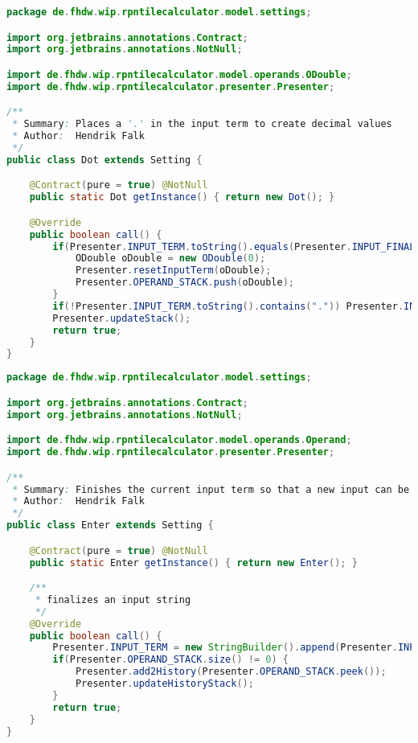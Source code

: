 \begin{lstlisting}[caption=Dot (Falk),label=list:Dot,language=Java]
package de.fhdw.wip.rpntilecalculator.model.settings;

import org.jetbrains.annotations.Contract;
import org.jetbrains.annotations.NotNull;

import de.fhdw.wip.rpntilecalculator.model.operands.ODouble;
import de.fhdw.wip.rpntilecalculator.presenter.Presenter;

/**
 * Summary: Places a '.' in the input term to create decimal values
 * Author:  Hendrik Falk
 */
public class Dot extends Setting {

    @Contract(pure = true) @NotNull
    public static Dot getInstance() { return new Dot(); }

    @Override
    public boolean call() {
        if(Presenter.INPUT_TERM.toString().equals(Presenter.INPUT_FINALIZED)) {
            ODouble oDouble = new ODouble(0);
            Presenter.resetInputTerm(oDouble);
            Presenter.OPERAND_STACK.push(oDouble);
        }
        if(!Presenter.INPUT_TERM.toString().contains(".")) Presenter.INPUT_TERM.append(".");
        Presenter.updateStack();
        return true;
    }
}
\end{lstlisting}    

\begin{lstlisting}[caption=Enter (Falk),label=list:Enter,language=Java]
package de.fhdw.wip.rpntilecalculator.model.settings;

import org.jetbrains.annotations.Contract;
import org.jetbrains.annotations.NotNull;

import de.fhdw.wip.rpntilecalculator.model.operands.Operand;
import de.fhdw.wip.rpntilecalculator.presenter.Presenter;

/**
 * Summary: Finishes the current input term so that a new input can be created
 * Author:  Hendrik Falk
 */
public class Enter extends Setting {

    @Contract(pure = true) @NotNull
    public static Enter getInstance() { return new Enter(); }

    /**
     * finalizes an input string
     */
    @Override
    public boolean call() {
        Presenter.INPUT_TERM = new StringBuilder().append(Presenter.INPUT_FINALIZED);
        if(Presenter.OPERAND_STACK.size() != 0) {
            Presenter.add2History(Presenter.OPERAND_STACK.peek());
            Presenter.updateHistoryStack();
        }
        return true;
    }
}

\end{lstlisting}    

